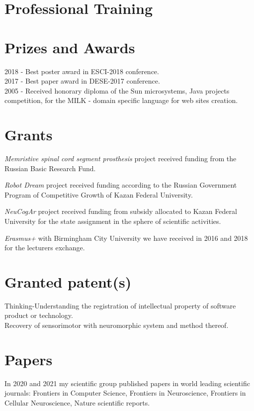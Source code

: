 \documentclass{moderncv}
\begin{document}
\section{Professional Training}


\section{Prizes and Awards}

2018 - Best poster award in ESCI-2018 conference.\\
2017 - Best paper award in DESE-2017 conference.\\
2005 - Received honorary diploma of the Sun microsystems, Java projects competition, for the MILK - domain specific language for web sites creation.\\

\section{Grants}

\emph{Memristive spinal cord segment prosthesis} project received funding from the Russian Basic Research Fund.

\emph{Robot Dream} project received funding according to the Russian Government Program of Competitive Growth of Kazan Federal University.

\emph{NeuCogAr} project received funding from subsidy allocated to Kazan Federal University for the state assignment in the sphere of scientific activities.

\emph{Erasmus+} with Birmingham City University we have received in 2016 and 2018 for the lecturers exchange. 

\section{Granted patent(s)}

Thinking-Understanding the registration of intellectual property of software product or technology.\\
Recovery of sensorimotor  with neuromorphic system and method thereof.

\section{Papers}
In 2020 and 2021 my scientific group published papers in world leading scientific journals:
Frontiers in Computer Science, Frontiers in Neuroscience, Frontiers in Cellular Neuroscience, Nature scientific reports.
\end{document}
